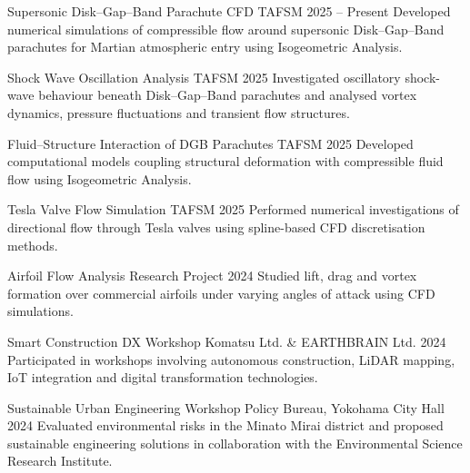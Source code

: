 
\ProjectsSection

\Project
{Supersonic Disk--Gap--Band Parachute CFD}
{TAFSM}
{2025 -- Present}
{
Developed numerical simulations of compressible flow around
supersonic Disk--Gap--Band parachutes for Martian atmospheric
entry using Isogeometric Analysis.
}

\vspace{0.010cm}

\Project
{Shock Wave Oscillation Analysis}
{TAFSM}
{2025}
{
Investigated oscillatory shock-wave behaviour beneath
Disk--Gap--Band parachutes and analysed vortex dynamics,
pressure fluctuations and transient flow structures.
}

\vspace{0.010cm}

\Project
{Fluid--Structure Interaction of DGB Parachutes}
{TAFSM}
{2025}
{
Developed computational models coupling structural deformation
with compressible fluid flow using Isogeometric Analysis.
}

\vspace{0.010cm}

\Project
{Tesla Valve Flow Simulation}
{TAFSM}
{2025}
{
Performed numerical investigations of directional flow through
Tesla valves using spline-based CFD discretisation methods.
}

\vspace{0.010cm}

\Project
{Airfoil Flow Analysis}
{Research Project}
{2024}
{
Studied lift, drag and vortex formation over commercial airfoils
under varying angles of attack using CFD simulations.
}

\vspace{0.010cm}

\Project
{Smart Construction DX Workshop}
{Komatsu Ltd. \& EARTHBRAIN Ltd.}
{2024}
{
Participated in workshops involving autonomous construction,
LiDAR mapping, IoT integration and digital transformation
technologies.
}

\vspace{0.010cm}

\Project
{Sustainable Urban Engineering Workshop}
{Policy Bureau, Yokohama City Hall}
{2024}
{
Evaluated environmental risks in the Minato Mirai district and
proposed sustainable engineering solutions in collaboration with
the Environmental Science Research Institute.
}
